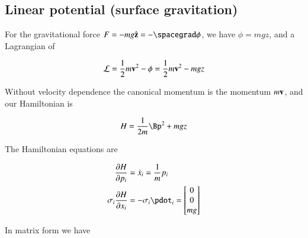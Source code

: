 \subsection{Linear potential (surface gravitation)}

For the gravitational force $F = - m g \zcap = - \spacegrad \phi$, we have $\phi = m g z$, and a Lagrangian of

\begin{align}\label{eqn:hamiltonian:roo1}
\mathcal{L} = \frac{1}{2} m \mathbf{v}^2 - \phi = \frac{1}{2} m \mathbf{v}^2 - m g z
\end{align}

Without velocity dependence the canonical momentum is the momentum $m \mathbf{v}$, and our Hamiltonian is

\begin{align}\label{eqn:hamiltonian:roo2}
H = \inv{2 m} \Bp^2 + m g z
\end{align}

The Hamiltonian equations are

\begin{align}\label{eqn:hamiltonian:roo3}
\PD{p_i}{H} &= \xdot_i = \inv{m} p_i \\
\sigma_i \PD{x_i}{H} &= -\sigma_i \pdot_i = \begin{bmatrix}0 \\ 0 \\ m g \end{bmatrix}
\end{align}

In matrix form we have

